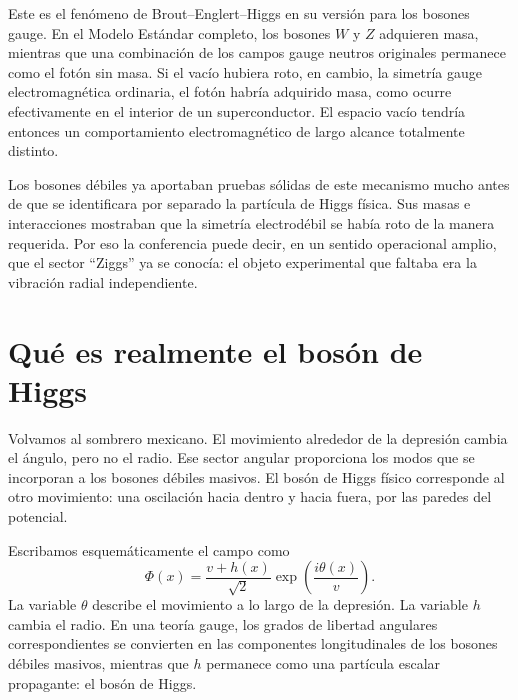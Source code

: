 Este es el fenómeno de Brout--Englert--Higgs en su versión para los bosones gauge. En el Modelo Estándar completo, los bosones $W$ y $Z$ adquieren masa, mientras que una combinación de los campos gauge neutros originales permanece como el fotón sin masa. Si el vacío hubiera roto, en cambio, la simetría gauge electromagnética ordinaria, el fotón habría adquirido masa, como ocurre efectivamente en el interior de un superconductor. El espacio vacío tendría entonces un comportamiento electromagnético de largo alcance totalmente distinto.

Los bosones débiles ya aportaban pruebas sólidas de este mecanismo mucho antes de que se identificara por separado la partícula de Higgs física. Sus masas e interacciones mostraban que la simetría electrodébil se había roto de la manera requerida. Por eso la conferencia puede decir, en un sentido operacional amplio, que el sector ``Ziggs'' ya se conocía: el objeto experimental que faltaba era la vibración radial independiente.


\section{Qué es realmente el bosón de Higgs}

Volvamos al sombrero mexicano. El movimiento alrededor de la depresión cambia el ángulo, pero no el radio. Ese sector angular proporciona los modos que se incorporan a los bosones débiles masivos. El bosón de Higgs físico corresponde al otro movimiento: una oscilación hacia dentro y hacia fuera, por las paredes del potencial.

Escribamos esquemáticamente el campo como
\begin{equation}
\Phi(x)
=
\frac{v+h(x)}{\sqrt{2}}
\exp\!\left(
  \frac{i\theta(x)}{v}
\right).
\end{equation}
La variable $\theta$ describe el movimiento a lo largo de la depresión. La variable $h$ cambia el radio. En una teoría gauge, los grados de libertad angulares correspondientes se convierten en las componentes longitudinales de los bosones débiles masivos, mientras que $h$ permanece como una partícula escalar propagante: el bosón de Higgs.

